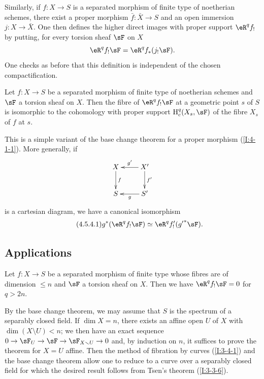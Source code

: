 Similarly, if $f:X\to S$ is a separated morphism of finite type of
noetherian schemes, there exist a proper morphism $\bar f:\bar X\to S$ and an
open immersion $j:X\to \bar X$. One then defines the higher direct images
with proper support $\eR^q f_!$ by putting, for every torsion sheaf
$\sF$ on $X$
\[
  \eR^q f_! \sF = \eR^q f_*(j_! \sF) \text{.}
\]
One checks as before that this definition is independent of
the chosen compactification. 





\begin{theorem}\label{I:4-5-4}
Let $f:X\to S$ be a separated morphism of finite type of noetherian schemes
and $\sF$ a torsion sheaf on $X$. Then the fibre of $\eR^q f_! \sF$ at a
geometric point $s$ of $S$ is isomorphic to the cohomology with proper
support $\h_c^q(X_s,\sF)$ of the fibre $X_s$ of $f$ at $s$.
\end{theorem}

This is a simple variant of the base change theorem for a proper
morphism (\ref{I:4-1-1}). More generally, if
\[\xymatrix{
  X \ar[d]^-f
    & X' \ar[l]_-{g'} \ar[d]^-{f'} \\
  S
    & S' \ar[l]^-g
}\]
is a cartesian diagram, we have a canonical isomorphism
\begin{equation*}\tag{4.5.4.1}\label{I:eq:4-5-4-1}
  g^* (\eR^q f_! \sF) \simeq \eR^q f_!'({g'}^* \sF) \text{.}
\end{equation*}










\subsection{Applications}\label{I:4-6}





\begin{theorem}[vanishing]\label{I:4-6-1}
Let $f:X\to S$ be a separated morphism of finite type whose fibres are of
dimension $\leqslant n$ and $\sF$ a torsion sheaf on $X$. Then we have
$\eR^q f_! \sF = 0$ for $q>2 n$.
\end{theorem}

By the base change theorem, we may assume that $S$ is
the spectrum of a separably closed field. If $\dim X = n$, there exists an
affine open $U$ of $X$ with $\dim(X\setminus U) < n$; we then have an exact
sequence $0\to \sF_U \to \sF \to \sF_{X\setminus U} \to 0$ and, by induction on $n$,
it suffices to prove the theorem for $X=U$ affine. Then the method of
fibration by curves (\ref{I:3-4-1}) and the base change
theorem allow one to reduce to a curve over a separably closed field
for which the desired result follows from Tsen's theorem
(\ref{I:3-3-6}). 





